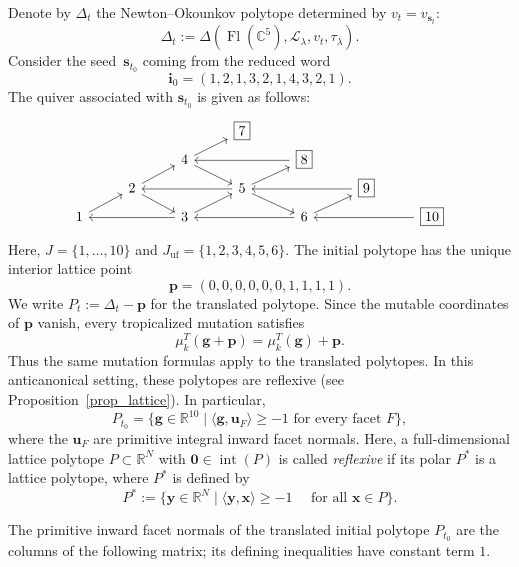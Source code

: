 \documentclass[10pt]{amsart}
\numberwithin{equation}{section}
\newcommand{\C}{{\mathbb{C}}}
\newcommand{\R}{{\mathbb{R}}}
\DeclareMathOperator{\flag}{Fl}
\theoremstyle{plain}
\theoremstyle{definition}
\theoremstyle{remark}
\begin{document}
Denote by $\Delta_t$ the Newton--Okounkov polytope determined by $v_t = v_{\bm s_t}$: 
\[
\Delta_t := \Delta(\flag(\C^5),\mathcal L_\lambda, v_t,\tau_\lambda). 
\]
Consider the seed~$\mathbf{s}_{t_0}$ coming from the reduced word 
\[
\bm i_0 = (1,2,1,3,2,1,4,3,2,1).
\]
The quiver associated with $\mathbf{s}_{t_0}$ is given as follows:
\begin{equation}\label{eq_quiver_0}
	\begin{tikzcd}[row sep = 0]
		&&& \fbox{7} \\
		&& 4 \arrow[ur] \arrow[dr] && \fbox{8} \arrow[ll] \\
		& 2 \arrow[ur] \arrow[dr] && 5 \arrow[ll] \arrow[ur] \arrow[dr] && \fbox{9} \arrow[ll] \\
		1 \arrow[ur] && 3 \arrow[ll] \arrow[ur] && 6 \arrow[ll] \arrow[ur] && \fbox{10} \arrow[ll]
	\end{tikzcd}
\end{equation}
Here, $J = \{1, \ldots, 10\}$ and $J_{\mathrm{uf}} = \{1,2,3,4,5,6\}$. 
The initial polytope has the unique interior lattice point
\[
\mathbf p=(0,0,0,0,0,0,1,1,1,1).
\]
We write $P_t:=\Delta_t-\mathbf p$ for the translated polytope.
Since the mutable coordinates of $\mathbf p$ vanish, every
tropicalized mutation satisfies
\[
\mu_k^T(\mathbf g+\mathbf p)=\mu_k^T(\mathbf g)+\mathbf p.
\]
Thus the same mutation formulas apply to the translated polytopes.
In this anticanonical setting, these polytopes are reflexive (see Proposition~\ref{prop_lattice}). In particular,
\[
P_{t_0}=\{\mathbf g\in\R^{10}\mid
\langle\mathbf g,\mathbf u_F\rangle\geq-1
\text{ for every facet }F\},
\]
where the $\mathbf u_F$ are primitive integral inward facet normals.
Here, a full-dimensional lattice polytope $P \subset \R^N$ 
with $\mathbf 0 \in \operatorname{int}(P)$ is called \emph{reflexive} if its polar $P^*$ is a lattice polytope, where $P^*$ is defined by 
\[
P^* := \{ \mathbf{y} \in \R^N \mid \langle \mathbf{y}, \mathbf{x} \rangle \geq -1 \quad \text{ for all }\mathbf{x} \in P \}.
\]



The primitive inward facet normals of the translated
initial polytope $P_{t_0}$ are the columns of the
following matrix; its defining inequalities have
constant term $1$.
\end{document}
